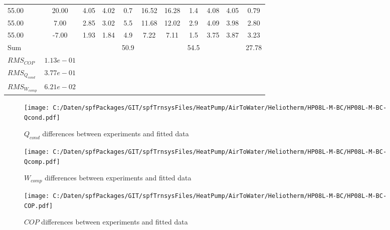 \documentclass[english]{SPFShortReport}
\begin{document}
\begin{table}[!ht]
\begin{small}
\begin{center}
{\begin{tabular}{l | c c c c c c c c c c }
55.00  & 20.00 & 4.05 & 4.02 & 0.7 & 16.52 & 16.28 & 1.4 & 4.08 & 4.05 & 0.79\\ 
55.00  & 7.00 & 2.85 & 3.02 & 5.5 & 11.68 & 12.02 & 2.9 & 4.09 & 3.98 & 2.80\\ 
55.00  & -7.00 & 1.93 & 1.84 & 4.9 & 7.22 & 7.11 & 1.5 & 3.75 & 3.87 & 3.23\\ 
\hline 
 Sum &  & &  & 50.9 &  &  & 54.5 & &  & 27.78\\ 
\hline 
 $RMS_{COP}$ & $1.13e-01$ \\ 
 $RMS_{Q_{cond}}$ & $3.77e-01$ \\ 
 $RMS_{W_{comp}}$ & $6.21e-02$ \\ 
\hline
\hline
\end{tabular}
}
\label{ErrorsTable}
\end{center}
\end{small}
\end{table}
\begin{figure}[!ht]
\begin{center}
\texttt{[image: C:/Daten/spfPackages/GIT/spfTrnsysFiles/HeatPump/AirToWater/Heliotherm/HP08L-M-BC/HP08L-M-BC-Qcond.pdf]}
\caption{$Q_{cond}$ differences between experiments and fitted data}
\label{QcongFig}
\end{center}
\end{figure}
\begin{figure}[!ht]
\begin{center}
\texttt{[image: C:/Daten/spfPackages/GIT/spfTrnsysFiles/HeatPump/AirToWater/Heliotherm/HP08L-M-BC/HP08L-M-BC-Qcomp.pdf]}
\caption{$W_{comp}$ differences between experiments and fitted data}
\label{QcompFig}
\end{center}
\end{figure}
\begin{figure}[!ht]
\begin{center}
\texttt{[image: C:/Daten/spfPackages/GIT/spfTrnsysFiles/HeatPump/AirToWater/Heliotherm/HP08L-M-BC/HP08L-M-BC-COP.pdf]}
\caption{$COP$ differences between experiments and fitted data}
\label{COPFig}
\end{center}
\end{figure}
\end{document}
